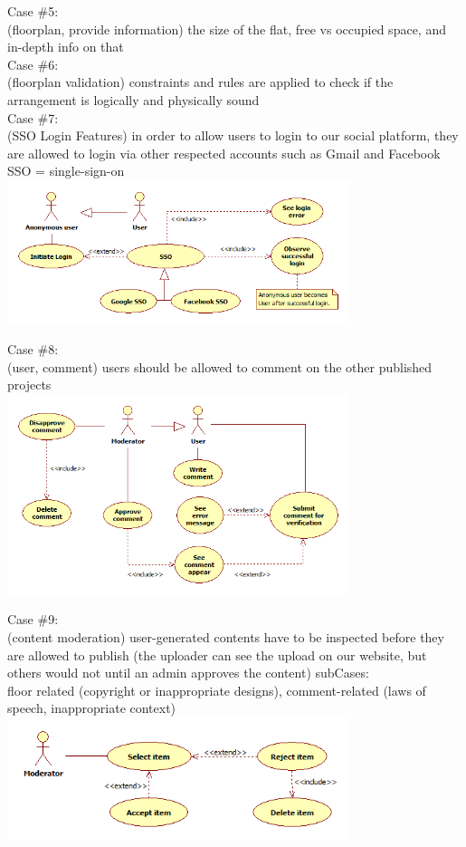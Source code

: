 			
			\noindent Case \#5:\\
			(floorplan, provide information)
			the size of the flat, free vs occupied space, and in-depth info on that\\
			
			
			\noindent Case \#6:\\
			(floorplan validation)
			constraints and rules are applied to check if the arrangement is logically and physically sound\\
			
			
			\noindent Case \#7:\\
			(SSO Login Features)
			in order to allow users to login to our social platform, they are allowed to login via other respected accounts such as Gmail and Facebook\\
			SSO = single-sign-on\\
			\includegraphics[width=0.75\textwidth]{images/UseCase7.png}
			
			\noindent Case \#8:\\
			(user, comment)
			users should be allowed to comment on the other published projects\\
			\includegraphics[width=0.75\textwidth]{images/UseCase8.png}
			
			
			\noindent Case \#9:\\
			(content moderation)
			user-generated contents have to be inspected before they are allowed to publish (the uploader can see the upload on our website, but others would not until an admin approves the content)
			sub\noindent Cases:\\ floor related (copyright or inappropriate designs), comment-related (laws of speech, inappropriate context)\\
			\includegraphics[width=0.75\textwidth]{images/UseCase9.png}
			
